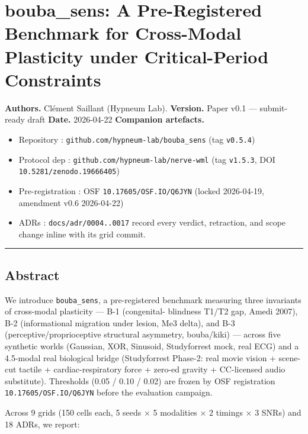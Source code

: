 \documentclass[
]{article}
\author{}
\date{}
\providecommand{\tightlist}{%
  \setlength{\itemsep}{0pt}\setlength{\parskip}{0pt}}
\begin{document}
{
\setcounter{tocdepth}{3}
\tableofcontents
}
\section{bouba\_sens: A Pre-Registered Benchmark for Cross-Modal
Plasticity under Critical-Period
Constraints}\label{bouba_sens-a-pre-registered-benchmark-for-cross-modal-plasticity-under-critical-period-constraints}

\textbf{Authors.} Clément Saillant (Hypneum Lab). \textbf{Version.}
Paper v0.1 --- submit-ready draft \textbf{Date.} 2026-04-22
\textbf{Companion artefacts.}

\begin{itemize}
\tightlist
\item
  Repository : \texttt{github.com/hypneum-lab/bouba\_sens} (tag
  \texttt{v0.5.4})
\item
  Protocol dep : \texttt{github.com/hypneum-lab/nerve-wml} (tag
  \texttt{v1.5.3}, DOI \texttt{10.5281/zenodo.19666405})
\item
  Pre-registration : OSF \texttt{10.17605/OSF.IO/Q6JYN} (locked
  2026-04-19, amendment v0.6 2026-04-22)
\item
  ADRs : \texttt{docs/adr/0004..0017} record every verdict, retraction,
  and scope change inline with its grid commit.
\end{itemize}

\begin{center}\rule{0.5\linewidth}{0.5pt}\end{center}

\subsection{Abstract}\label{abstract}

We introduce \texttt{bouba\_sens}, a pre-registered benchmark measuring
three invariants of cross-modal plasticity --- B-1 (congenital-
blindness T1/T2 gap, Amedi 2007), B-2 (informational migration under
lesion, Me3 delta), and B-3 (perceptive/proprioceptive structural
asymmetry, bouba/kiki) --- across five synthetic worlds (Gaussian, XOR,
Sinusoid, Studyforrest mock, real ECG) and a 4.5-modal real biological
bridge (Studyforrest Phase-2: real movie vision + scene-cut tactile +
cardiac-respiratory force + zero-ed gravity + CC-licensed audio
substitute). Thresholds (0.05 / 0.10 / 0.02) are frozen by OSF
registration \texttt{10.17605/OSF.IO/Q6JYN} before the evaluation
campaign.

Across 9 grids (150 cells each, 5 seeds × 5 modalities × 2 timings × 3
SNRs) and 18 ADRs, we report:
\end{document}
